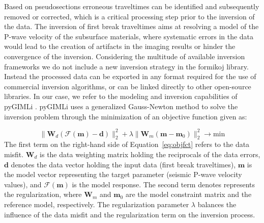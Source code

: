 \documentclass[a4paper,fleqn]{cas-sc}
\newcommand{\vecmat}[1]{\bm #1}
\begin{document}
Based on pseudosections erroneous traveltimes can be identified and subsequently removed or corrected, which is a critical processing step prior to the inversion of the data. The inversion of first break traveltimes aims at resolving a model of the P-wave velocity of the subsurface materials, where systematic errors in the data would lead to the creation of artifacts in the imaging results or hinder the convergence of the inversion.
Considering the multitude of available inversion frameworks we do not include a new inversion strategy in the formikoj library. Instead the processed data can be exported in any format required for the use of commercial inversion algorithms, or can be linked directly to other open-source libraries. In our case, we refer to the modeling and inversion capabilities of pyGIMLi \citep{ruecker2017}.
pyGIMLi uses a generalized Gauss-Newton method to solve the inversion problem through the minimization of an objective function given as:

\begin{equation}
	\parallel\vecmat{W}_d\left(\mathcal{F}\left(\vecmat{m}\right)-\vecmat{d}\right)\parallel_2^2+\lambda\parallel\vecmat{W}_m\left(\vecmat{m}-\vecmat{m}_0\right)\parallel_2^2\rightarrow\textrm{min}
	\label{eq:objfct}
\end{equation}
The first term on the right-hand side of Equation~\ref{eq:objfct} refers to the data misfit. $\vecmat{W}_d$ is the data weighting matrix holding the reciprocals of the data errors, $\vecmat{d}$ denotes the data vector holding the input data (first break traveltimes), $\vecmat{m}$ is the model vector representing the target parameter (seismic P-wave velocity values), and $\mathcal{F}\left(\vecmat{m}\right)$ is the model response.
The second term denotes represents the regularization, where $\vecmat{W}_m$ and $\vecmat{m}_0$ are the model constraint matrix and the reference model, respectively. The regularization parameter $\lambda$ balances the influence of the data misfit and the regularization term on the inversion process.
\end{document}
